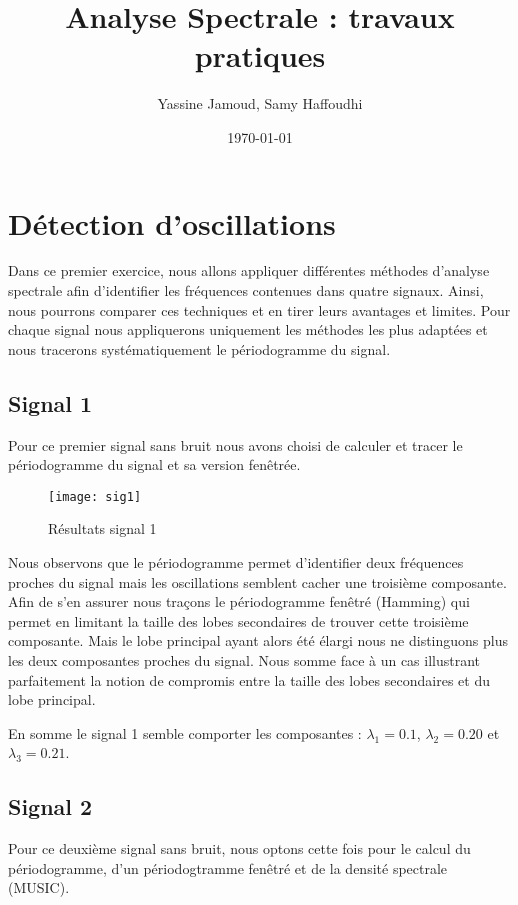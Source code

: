 \documentclass[12pt,a4paper,titlepage]{article}
\title{Analyse Spectrale : travaux pratiques}
\author{Yassine Jamoud, Samy Haffoudhi}
\date{\today}
\begin{document}
\maketitle

\section{Détection d'oscillations}

Dans ce premier exercice, nous allons appliquer différentes méthodes d'analyse spectrale afin
d'identifier les fréquences contenues dans quatre signaux. Ainsi, nous pourrons comparer ces
techniques et en tirer leurs avantages et limites. Pour chaque signal nous appliquerons uniquement
les méthodes les plus adaptées et nous tracerons systématiquement le périodogramme du signal.

\subsection*{Signal 1}

Pour ce premier signal sans bruit nous avons choisi de calculer et tracer le périodogramme du
signal et sa version fenêtrée.

\begin{figure}[H]
    \caption{Résultats signal 1}
    \texttt{[image: sig1]}
    \centering
\end{figure}

Nous observons que le périodogramme permet d'identifier deux fréquences proches du signal
mais les oscillations semblent cacher une troisième composante. Afin de s'en assurer nous
traçons le périodogramme fenêtré (Hamming) qui permet en limitant la taille des lobes secondaires
de trouver cette troisième composante. Mais le lobe principal ayant alors été élargi nous ne distinguons
plus les deux composantes proches du signal. Nous somme face à un cas illustrant parfaitement la
notion de compromis entre la taille des lobes secondaires et du lobe principal.

En somme le signal 1 semble comporter les composantes : $\lambda_1 = 0.1$, $\lambda_2 = 0.20$ et
$\lambda_3 = 0.21$.

\subsection*{Signal 2}

Pour ce deuxième signal sans bruit, nous optons cette fois pour le calcul du périodogramme, d'un
périodogtramme fenêtré et de la densité spectrale (MUSIC).
\end{document}
